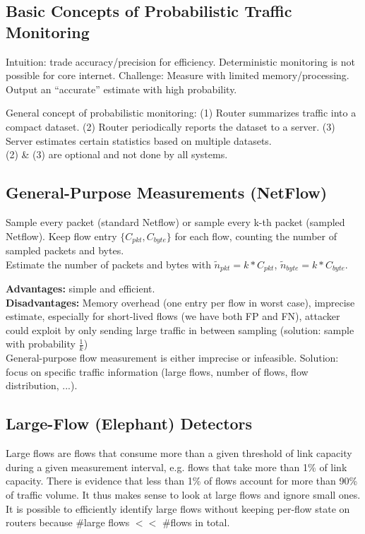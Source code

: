 \documentclass[11pt,oneside,a4paper]{article}
\begin{document}
\subsection{Basic Concepts of Probabilistic Traffic	Monitoring}

Intuition: trade accuracy/precision for efficiency. Deterministic monitoring is not possible for core internet. Challenge: Measure with limited memory/processing. Output an “accurate” estimate with high probability.

General concept of probabilistic monitoring: (1) Router summarizes traffic into a compact dataset. (2) Router periodically reports the dataset to a server. (3) Server estimates certain statistics based on multiple datasets.\\
(2) \& (3) are optional and not done by all systems.

\subsection{General-Purpose Measurements (NetFlow)}

Sample every packet (standard Netflow) or sample every k-th packet (sampled Netflow). Keep flow entry $\{C_{pkt}, C_{byte}\}$ for each flow, counting the number of sampled packets and bytes.\\ Estimate the number of packets and bytes with $\widetilde{n}_{pkt} = k*C_{pkt}$, $\widetilde{n}_{byte} = k*C_{byte}$.

\newpage

\textbf{Advantages:} simple and efficient.\\
\textbf{Disadvantages:} Memory overhead (one entry per flow in worst case), imprecise estimate, especially for short-lived flows (we have both FP and FN), attacker could exploit by only sending large traffic in between sampling (solution: sample with probability $\frac{1}{k}$)\\

General-purpose flow measurement is either imprecise or infeasible. Solution: focus on specific traffic information (large flows, number of flows, flow distribution, ...).

\subsection{Large-Flow (Elephant) Detectors}

Large flows are flows that consume more than a given threshold of link capacity during a given measurement interval, e.g. flows that take more than 1\% of link capacity. There is evidence that less than 1\% of flows account for more than 90\% of traffic volume. It thus makes sense to look at large flows and ignore small ones.\\
It is possible to efficiently identify large flows without keeping per-flow state on routers because \#large flows $<<$ \#flows in total.
\end{document}
